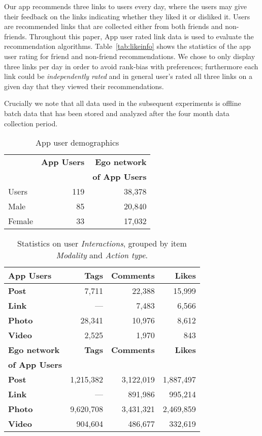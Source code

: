 Our app recommends three links to users every day, where the users may give
their feedback on the links indicating whether they liked it or
disliked it. Users are recommended links that are collected either
from both friends and non-friends. Throughout this paper, App user rated
link data is used to evaluate the recommendation algorithms.
Table~\ref{tab:likeinfo} shows the statistics of the app user rating
for friend and non-friend recommendations.  We chose to only display
three links per day in order to avoid rank-bias with preferences;
furthermore each link could be \emph{independently rated} and in general
user's rated all three links on a given day that they viewed their
recommendations.

Crucially we note that all data used in the subsequent experiments
is offline batch data that has been stored and analyzed after the four month
data collection period.  
      							
\begin{table}
\centering
\begin{tabular}{|>{\small}l|>{\small}r|>{\small}r|}
\hline
& \textbf{App Users} & \textbf{Ego network} \\
& & \textbf{of App Users} \\
\hline
Users & 119 & 38,378 \\
\hline
Male & 85 & 20,840 \\
\hline
Female & 33 & 17,032 \\
\hline
\end{tabular}
\caption{App user demographics}
\label{tab:demographics}
\end{table}

\begin{table}
\centering
\begin{tabular}{|>{\small}l|>{\small}r|>{\small}r|>{\small}r|}
\hline
\textbf{App Users} & \textbf{Tags} & \textbf{Comments} & \textbf{Likes} \\
\hline
\textbf{Post} & 7,711 & 22,388 & 15,999 \\
\hline
\textbf{Link}  & --- & 7,483 & 6,566 \\
\hline
\textbf{Photo} & 28,341 & 10,976 & 8,612 \\
\hline
\textbf{Video} & 2,525 & 1,970 & 843 \\
\hline
\hline
\textbf{Ego network} & \textbf{Tags} & \textbf{Comments} & \textbf{Likes} \\
\textbf{of App Users}  & & & \\
\hline
\textbf{Post} & 1,215,382 & 3,122,019 & 1,887,497 \\
\hline
\textbf{Link} & --- & 891,986 & 995,214 \\
\hline
\textbf{Photo} & 9,620,708 & 3,431,321 & 2,469,859 \\
\hline
\textbf{Video} & 904,604 & 486,677 & 332,619 \\
\hline
\end{tabular}
\caption{Statistics on user {\em Interactions}, grouped by item {\em Modality} and {\em Action type}.}
\label{tab:interactions}
\end{table}


